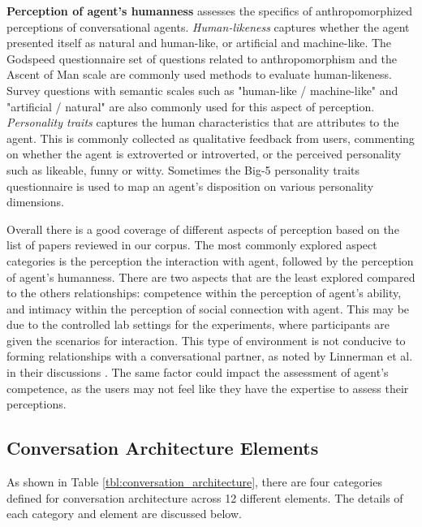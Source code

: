 \textbf{Perception of agent's humanness} assesses the specifics of anthropomorphized perceptions of conversational agents. \textit{Human-likeness} captures whether the agent presented itself as natural and human-like, or artificial and machine-like. The Godspeed questionnaire \cite{bartneck2009measurement} set of questions related to anthropomorphism and the Ascent of Man scale \cite{kteily2015ascent} are commonly used methods to evaluate human-likeness. Survey questions with semantic scales such as "human-like / machine-like" and "artificial / natural" are also commonly used for this aspect of perception. \textit{Personality traits} captures the human characteristics that are attributes to the agent. This is commonly collected as qualitative feedback from users, commenting on whether the agent is extroverted or introverted, or the perceived personality such as likeable, funny or witty. Sometimes the Big-5 personality traits questionnaire \cite{gosling2003very} is used to map an agent's disposition on various personality dimensions.

Overall there is a good coverage of different aspects of perception based on the list of papers reviewed in our corpus. The most commonly explored aspect categories is the perception the interaction with agent, followed by the perception of agent's humanness. There are two aspects that are the least explored compared to the others relationships: competence within the perception of agent's ability, and intimacy within the perception of social connection with agent. This may be due to the controlled lab settings for the experiments, where participants are given the scenarios for interaction. This type of environment is not conducive to forming relationships with a conversational partner, as noted by Linnerman et al. in their discussions \cite{linnemann2018can}\cmt{[15]}. The same factor could impact the assessment of agent's competence, as the users may not feel like they have the expertise to assess their perceptions. 




\subsection{Conversation Architecture Elements}

As shown in Table \ref{tbl:conversation_architecture}, there are four categories defined for conversation architecture across 12 different elements. The details of each category and element are discussed below.

